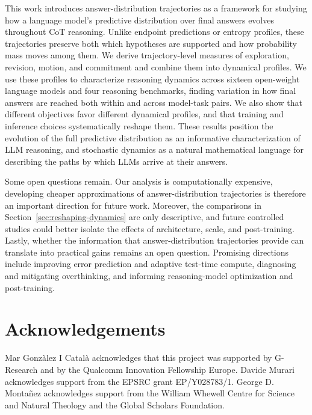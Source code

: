\documentclass{article}
\begin{document}
This work introduces answer-distribution trajectories as a framework for studying how a language model’s predictive distribution over final answers evolves throughout CoT reasoning. Unlike endpoint predictions or entropy profiles, these trajectories preserve both which hypotheses are supported and how probability mass moves among them. We derive trajectory-level measures of exploration, revision, motion, and commitment and combine them into dynamical profiles. We use these profiles to characterize reasoning dynamics across sixteen open-weight language models and four reasoning benchmarks, finding variation in how final answers are reached both within and across model-task pairs. We also show that different objectives favor different dynamical profiles, and that training and inference choices systematically reshape them. These results position the evolution of the full predictive distribution as an informative characterization of LLM reasoning, and stochastic dynamics as a natural mathematical language for describing the paths by which LLMs arrive at their answers.

Some open questions remain. Our analysis is computationally expensive, developing cheaper approximations of answer-distribution trajectories is therefore an important direction for future work. Moreover, the comparisons in Section~\ref{sec:reshaping-dynamics} are only descriptive, and future controlled studies could better isolate the effects of architecture, scale, and post-training. Lastly, whether the information that answer-distribution trajectories provide can translate into practical gains remains an open question. Promising directions include improving error prediction and adaptive test-time compute, diagnosing and mitigating overthinking, and informing reasoning-model optimization and post-training.

\section*{Acknowledgements}

Mar Gonzàlez I Català acknowledges that this project was supported by G-Research and by the Qualcomm Innovation Fellowship Europe. Davide Murari acknowledges support from the EPSRC grant EP/Y028783/1. George D. Monta\~nez acknowledges support from the William Whewell Centre for Science and Natural Theology and the Global Scholars Foundation.

\printbibliography

\newpage
\end{document}
